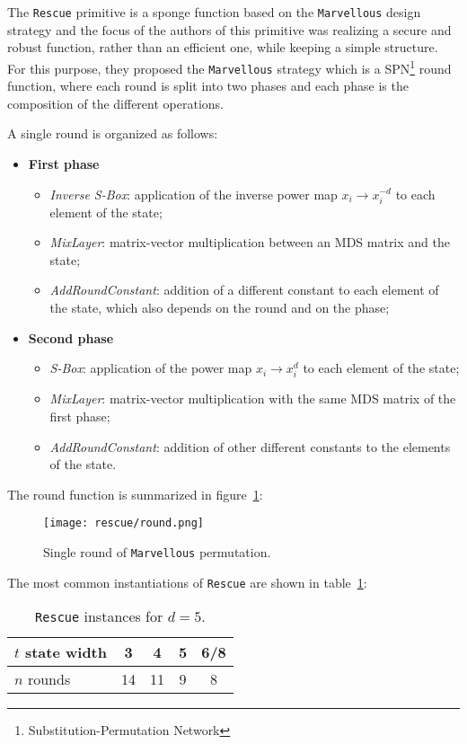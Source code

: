 \documentclass[12pt, a4paper]{report}
\begin{document}
The \texttt{Rescue} primitive is a sponge function based on the \texttt{Marvellous} design strategy and the focus of the authors of this primitive was realizing a secure and robust function, rather than an efficient one, while keeping a simple structure.
For this purpose, they proposed the \texttt{Marvellous} strategy which is a SPN\footnote{Substitution-Permutation Network} round function, where each round is split into two phases and each phase is the composition of the different operations.

A single round is organized as follows:
\begin{itemize}
  \item \textbf{First phase}
  \begin{itemize}
    \item \textit{Inverse S-Box}: application of the inverse power map $x_i \rightarrow x_i^{-d}$ to each element of the state;
    \item \textit{MixLayer}: matrix-vector multiplication between an MDS matrix and the state;
    \item \textit{AddRoundConstant}: addition of a different constant to each element of the state, which also depends on the round and on the phase;
  \end{itemize}
  \item \textbf{Second phase}
  \begin{itemize}
    \item \textit{S-Box}: application of the power map $x_i \rightarrow x_i^d$ to each element of the state;
    \item \textit{MixLayer}: matrix-vector multiplication with the same MDS matrix of the first phase;
    \item \textit{AddRoundConstant}: addition of other different constants to the elements of the state.
  \end{itemize}
\end{itemize}

The round function is summarized in figure~\ref{fig:rescue}:
\begin{figure}[H]
  \begin{center}
    \texttt{[image: rescue/round.png]}
  \end{center}
  \caption{Single round of \texttt{Marvellous} permutation.}\label{fig:rescue}
\end{figure}

The most common instantiations of \texttt{Rescue} are shown in table~\ref{tab:rescueinstances}:
\begin{table}[H]
  \caption{\texttt{Rescue} instances for $d = 5$.}\label{tab:rescueinstances}
  \begin{center}
    \begin{tabular}{|l|c|c|c|c|}
      \hline
      $t$ state width & 3 & 4 & 5 & 6/8 \\
      \hline
      $n$ rounds & 14 & 11 & 9 & 8 \\
      \hline
    \end{tabular}
  \end{center}
\end{table}
\end{document}
